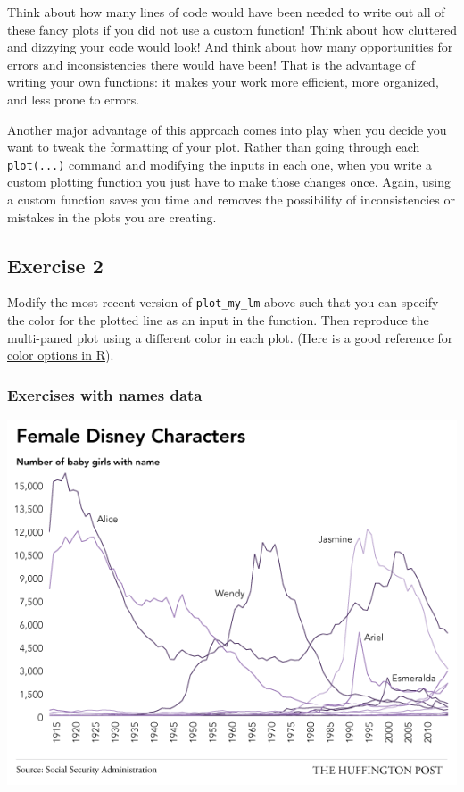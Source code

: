\documentclass[
]{book}
\begin{document}
Think about how many lines of code would have been needed to write out all of these fancy plots if you did not use a custom function! Think about how cluttered and dizzying your code would look! And think about how many opportunities for errors and inconsistencies there would have been! That is the advantage of writing your own functions: it makes your work more efficient, more organized, and less prone to errors.

Another major advantage of this approach comes into play when you decide you want to tweak the formatting of your plot. Rather than going through each \texttt{plot(...)} command and modifying the inputs in each one, when you write a custom plotting function you just have to make those changes once. Again, using a custom function saves you time and removes the possibility of inconsistencies or mistakes in the plots you are creating.

\hypertarget{exercise-2-6}{%
\subsection*{Exercise 2}\label{exercise-2-6}}

Modify the most recent version of \texttt{plot\_my\_lm} above such that you can specify the color for the plotted line as an input in the function. Then reproduce the multi-paned plot using a different color in each plot. (Here is a good reference for \href{http://www.stat.columbia.edu/~tzheng/files/Rcolor.pdf}{color options in R}).

\hypertarget{exercises-with-names-data}{%
\subsubsection*{Exercises with names data}\label{exercises-with-names-data}}

\includegraphics{img/baby_names.png}
\end{document}
